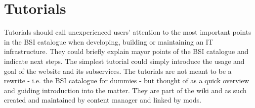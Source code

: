 \section{Tutorials}
\label{tutorials}

Tutorials should call unexperienced users' attention to the most important points in the BSI catalogue when developing, building or maintaining an IT infrastructure.
They could briefly explain mayor points of the BSI catalogue and indicate next steps.
The simplest tutorial could simply introduce the usage and goal of the website and its subservices.
The tutorials are not meant to be a rewrite - i.e. the BSI catalogue for dummies - but thought of as a quick overview and guiding introduction into the matter.
They are part of the wiki and as such created and maintained by content manager and linked by mods.
